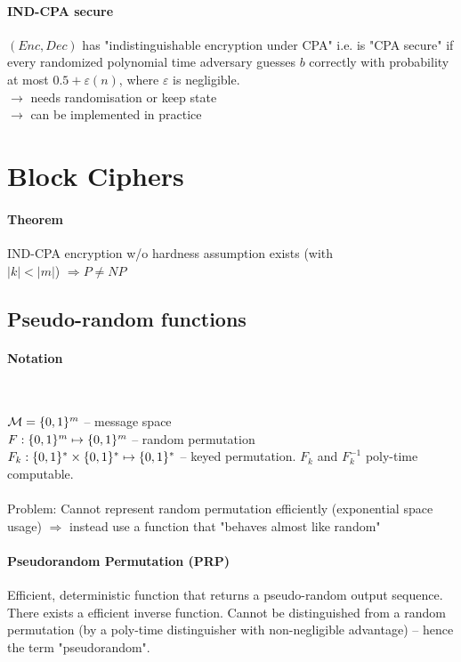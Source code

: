 \paragraph{IND-CPA secure}
$(Enc, Dec)$ has "indistinguishable encryption under CPA" i.e. is "CPA secure" if every randomized polynomial time adversary guesses $b$ correctly with probability at most $0.5+\varepsilon(n)$, where $\varepsilon$ is negligible.\\
$\rightarrow$ needs randomisation or keep state \\
$\rightarrow$ can be implemented in practice


%
%
\newpage
\section{Block Ciphers}

\paragraph{Theorem} IND-CPA encryption w/o hardness assumption exists (with\\ $|k| < |m|$) $\Rightarrow P \ne NP$ 

\subsection{Pseudo-random functions}
%
\paragraph{Notation} ~

$\mathcal{M} = \lbrace 0, 1 \rbrace^m$ -- message space\\
$F: \lbrace 0, 1 \rbrace^m \mapsto  \lbrace 0, 1 \rbrace^m $ -- random permutation \\
$F_k: \lbrace 0, 1 \rbrace^* \times \lbrace 0, 1 \rbrace^* \mapsto  \lbrace 0, 1 \rbrace^* $ -- keyed permutation. $F_k$ and $F^{-1}_k$ poly-time computable.
\\ \\
Problem: Cannot represent random permutation efficiently (exponential space usage) $\Rightarrow$ instead use a function that "behaves almost like random"

\paragraph{Pseudorandom Permutation (PRP)} Efficient, deterministic function that returns a pseudo-random output sequence. There exists a efficient inverse function. Cannot be distinguished from a random permutation (by a poly-time distinguisher with non-negligible advantage) -- hence the term "pseudorandom".

